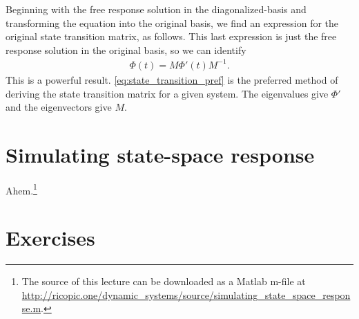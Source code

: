 \documentclass[dynamic_systems.tex]{subfiles}
\begin{document}
Beginning with the free response solution in the diagonalized-basis and transforming the equation into the original basis, we find an expression for the original state transition matrix, as follows.
\tags{}
\noindent This last expression is just the free response solution in the original basis, so we can identify
\begin{align}\label{eq:state_transition_pref}
	\Phi(t) = M \Phi'(t) M^{-1}.
\end{align}
This is a powerful result.
\autoref{eq:state_transition_pref} is the preferred method of deriving the state transition matrix for a given system.
The eigenvalues give $\Phi'$ and the eigenvectors give $M$.

%

\section{Simulating state-space response}
\tags{}

Ahem.\footnote{The source of this lecture can be downloaded as a Matlab m-file at \url{http://ricopic.one/dynamic_systems/source/simulating_state_space_response.m}.}





\section*{Exercises}


\end{document}
